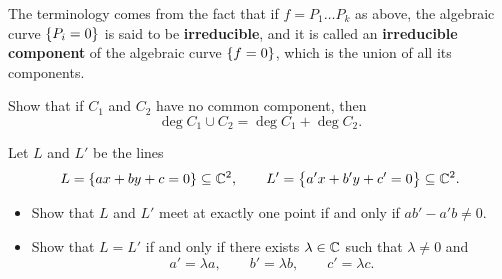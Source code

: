 \begin{remark}
The terminology comes from the fact that if $ f = P_1 \dots P_k $ as above, the algebraic curve $ \cbr{P_i = 0} $ is said to be \textbf{irreducible}, and it is called an \textbf{irreducible component} of the algebraic curve $ \cbr{f = 0} $, which is the union of all its components.
\end{remark}

\begin{exercise**}
Show that if $ C_1 $ and $ C_2 $ have no common component, then
$$ \deg C_1 \cup C_2 = \deg C_1 + \deg C_2. $$
\end{exercise**}

\begin{exercise**}
Let $ L $ and $ L' $ be the lines
$$ L = \cbr{ax + by + c = 0} \subseteq \CC^2, \qquad L' = \cbr{a'x + b'y + c' = 0} \subseteq \CC^2. $$
\begin{itemize}
\item Show that $ L $ and $ L' $ meet at exactly one point if and only if $ ab' - a'b \ne 0 $.
\item Show that $ L = L' $ if and only if there exists $ \lambda \in \mathbb{C} $ such that $ \lambda \ne 0 $ and
$$ a' = \lambda a, \qquad b' = \lambda b, \qquad c' = \lambda c. $$
\end{itemize}
\end{exercise**}

\pagebreak

